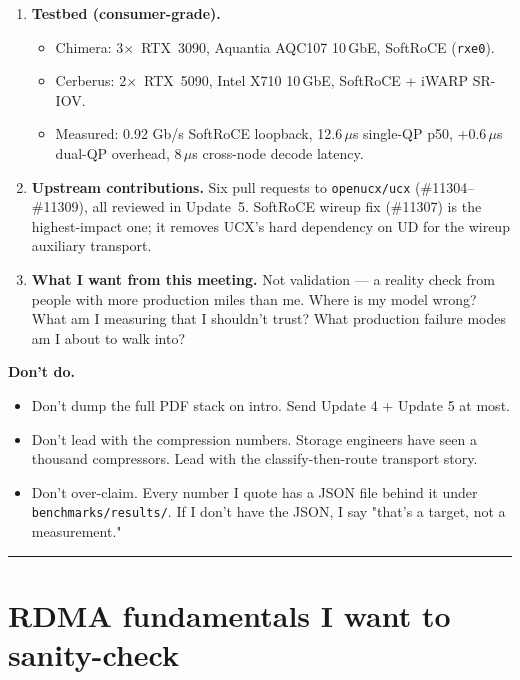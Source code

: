 \documentclass[11pt]{article}
\begin{document}
\begin{enumerate}
\item \textbf{Testbed (consumer-grade).}
  \begin{itemize}
  \item Chimera: 3$\times$~RTX~3090, Aquantia AQC107 10\,GbE, SoftRoCE
  (\texttt{rxe0}).
  \item Cerberus: 2$\times$~RTX~5090, Intel X710 10\,GbE, SoftRoCE +
  iWARP SR-IOV.
  \item Measured: 0.92 Gb/s SoftRoCE loopback, 12.6\,$\mu$s single-QP
  p50, +0.6\,$\mu$s dual-QP overhead, 8\,$\mu$s cross-node decode
  latency.
  \end{itemize}

\item \textbf{Upstream contributions.} Six pull requests to
\texttt{openucx/ucx} (\#11304--\#11309), all reviewed in Update~5.
SoftRoCE wireup fix (\#11307) is the highest-impact one; it removes
UCX's hard dependency on UD for the wireup auxiliary transport.

\item \textbf{What I want from this meeting.} Not validation --- a
reality check from people with more production miles than me. Where is
my model wrong? What am I measuring that I shouldn't trust? What
production failure modes am I about to walk into?
\end{enumerate}

\textbf{Don't do.}
\begin{itemize}
\item Don't dump the full PDF stack on intro. Send Update 4 + Update 5
at most.
\item Don't lead with the compression numbers. Storage engineers have
seen a thousand compressors. Lead with the classify-then-route
transport story.
\item Don't over-claim. Every number I quote has a JSON file behind it
under \texttt{benchmarks/results/}. If I don't have the JSON, I say
"that's a target, not a measurement."
\end{itemize}

\vspace{8pt}
\hrule
\vspace{6pt}

\section{RDMA fundamentals I want to sanity-check}
\end{document}
